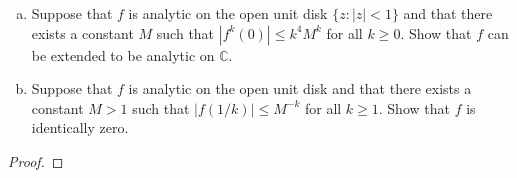 \documentclass{article}
\newenvironment{problem}[2][Problem]{\begin{trivlist}
\item[\hskip \labelsep {\bfseries #1}\hskip \labelsep {\bfseries #2.}]}{\end{trivlist}}
\begin{document}
\begin{problem}{4} $ $\\
  \begin{enumerate}[(a)]
    \item Suppose that $f$ is analytic on the open unit disk $\{ z : |z| < 1 \}$
    and that there exists a constant $M$ such that $|f^k(0)| \leq k^4 M^k$ for
    all $k \geq 0$. Show that $f$ can be extended to be analytic on
    $\mathbb{C}$.
    \item Suppose that $f$ is analytic on the open unit disk and that there
    exists a constant $M > 1$ such that $|f(1/k)| \leq M^{-k}$ for all
    $k \geq 1$. Show that $f$ is identically zero.
  \end{enumerate}
\end{problem}

\begin{proof}
\end{proof}
\end{document}
